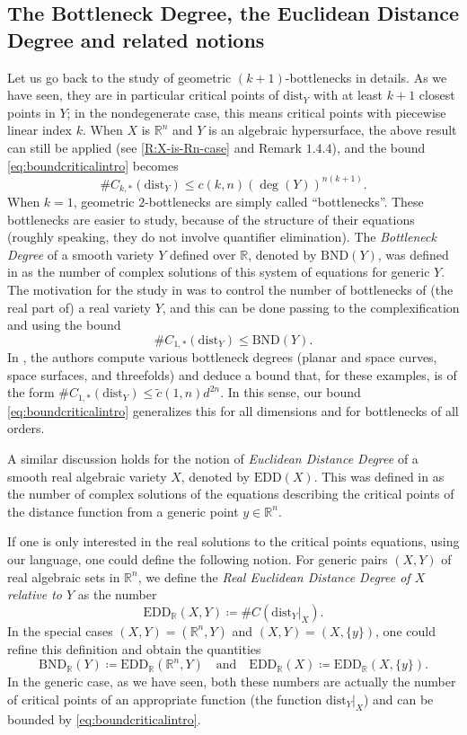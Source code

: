 \documentclass{amsart}
\newcommand{\R}{\mathbb{R}}
\newcommand{\dd}{\mathrm{dist}}
\newcommand{\dist}{{\mathrm{dist}_Y|_X}}
\def\lini{k}
\theoremstyle{definition}
\theoremstyle{remark}
\begin{document}
\subsection{The Bottleneck Degree, the Euclidean Distance Degree and related notions}
Let us go back to the study of geometric $(k+1)$-bottlenecks in details. As we have seen, they are in particular critical points of $\dd_Y$ with at least $k+1$ closest points in $Y$; in the nondegenerate case, this means critical points with piecewise linear index $\lini$. When $X$ is $\R^n$ and $Y$ is an algebraic hypersurface, the above result can still be applied (see \cref{R:X-is-Rn-case} and Remark $1.4.4$), and the  bound \eqref{eq:boundcriticalintro} becomes
\[
\#C_{\lini, *}(\dd_Y) \leq c(k,n)(\deg(Y))^{n (k + 1)}.
\]
When $k = 1$, geometric $2$-bottlenecks are simply called ``bottlenecks''. These bottlenecks are easier to study, because of the structure of their equations (roughly speaking, they do not involve quantifier elimination). The \emph{Bottleneck Degree} of a smooth variety $Y$ defined over $\R$, denoted by $\mathrm{BND}(Y)$, was defined in \cite{DiRocco_Eklund_Weinstein} as the number of complex solutions of this system of equations for generic $Y$.
The motivation for the study in \cite{DiRocco_Eklund_Weinstein} was to control the number of bottlenecks of (the real part of) a real variety $Y$, and this can be done passing to the complexification and using the bound 
\[\#C_{1,*}(\dd_Y) \leq \mathrm{BND}(Y).\] In \cite{DiRocco_Eklund_Weinstein}, the authors compute various bottleneck degrees (planar and space curves, space surfaces, and  threefolds) and deduce a bound that, for these examples, is of the form $\#C_{1,*}(\dd_Y) \leq \widetilde{c}(1, n) d^{2n}.$ In this sense, our bound \eqref{eq:boundcriticalintro} generalizes this for all dimensions and for bottlenecks of all orders.

A similar discussion holds for the notion of \emph{Euclidean Distance Degree} of a smooth real algebraic variety $X$, denoted by $\mathrm{EDD}(X)$. This was defined in \cite{EDD_Draisma} as the number of complex solutions of the equations describing the critical points of the distance function from a generic point $y \in \R^n$.  

If one is only interested in the real solutions to the critical points equations, using our language, one could define the following notion. For generic pairs $(X, Y)$ of real algebraic sets in $\R^n$, we define the  \emph{Real Euclidean Distance Degree of $X$ relative to $Y$} as the number
\[
\mathrm{EDD}_\R(X, Y) \coloneqq \#C(\dist).
\]
In the special cases $(X, Y) = (\R^n, Y)$ and $(X, Y) = (X, \{y\})$, one could refine this definition and obtain the quantities
\[
\mathrm{BND}_\R(Y) \coloneqq \mathrm{EDD}_\R(\R^n,Y) \quad \textrm{and} \quad \mathrm{EDD}_\R(X) \coloneqq \mathrm{EDD}_\R(X, \{y\}).
\]
In the generic case, as we have seen, both these numbers are actually the number of critical points of an appropriate function (the function $\dist$) and can be bounded by \eqref{eq:boundcriticalintro}. 
\end{document}
